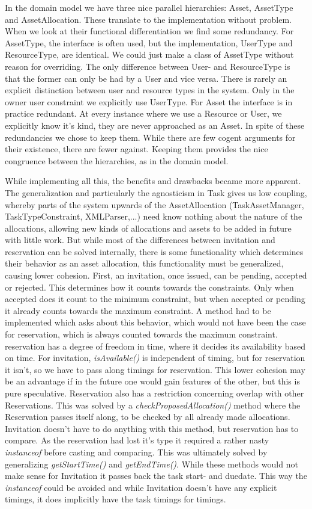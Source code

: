 				In the domain model we have three nice parallel hierarchies: Asset, AssetType and AssetAllocation. These translate to the implementation without problem. When we look at their functional differentiation we find some redundancy. For AssetType, the interface is often used, but the implementation, UserType and ResourceType, are identical. We could just make a class of AssetType without reason for overriding. The only difference between User- and ResourceType is that the former can only be had by a User and vice versa. There is rarely an explicit distinction between user and resource types in the system. Only in the owner user constraint we explicitly use UserType. For Asset the interface is in practice redundant. At every instance where we use a Resource or User, we explicitly know it's kind, they are never approached as an Asset. In spite of these redundancies we chose to keep them. While there are few cogent arguments for their existence, there are fewer against. Keeping them provides the nice congruence between the hierarchies, as in the domain model.
				
				While implementing all this, the benefits and drawbacks became more apparent. The generalization and particularly the agnosticism in Task gives us low coupling, whereby parts of the system upwards of the AssetAllocation (TaskAssetManager, TaskTypeConstraint, XMLParser,...) need know nothing about the nature of the allocations, allowing new kinds of allocations and assets to be added in future with little work. But while most of the differences between invitation and reservation can be solved internally, there is some functionality which determines their behavior as an asset allocation, this functionality must be generalized, causing lower cohesion. First, an invitation, once issued, can be pending, accepted or rejected. This determines how it counts towards the constraints. Only when accepted does it count to the minimum constraint, but when accepted or pending it already counts towards the maximum constraint. A method had to be implemented which asks about this behavior, which would not have been the case for reservation, which is always counted towards the maximum constraint. reservation has a degree of freedom in time, where it decides its availability based on time. For invitation, \emph{isAvailable()} is independent of timing, but for reservation it isn't, so we have to pass along timings for reservation. This lower cohesion may be an advantage if in the future one would gain features of the other, but this is pure speculative. Reservation also has a restriction concerning overlap with other Reservations. This was solved by a \emph{checkProposedAllocation()} method where the Reservation passes itself along, to be checked by all already made allocations. Invitation doesn't have to do anything with this method, but reservation has to compare. As the reservation had lost it's type it required a rather nasty \emph{instanceof} before casting and comparing. This was ultimately solved by generalizing \emph{getStartTime()} and \emph{getEndTime()}. While these methods would not make sense for Invitation it passes back the task start- and duedate. This way the \emph{instanceof} could be avoided and while Invitation doesn't have any explicit timings, it does implicitly have the task timings for timings. 

